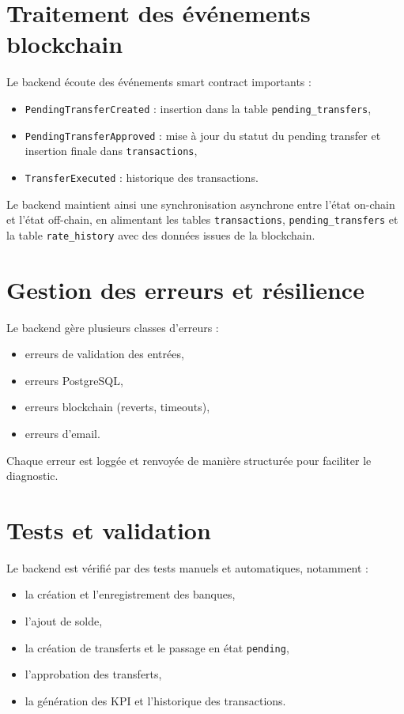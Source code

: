 \documentclass[a4paper,12pt]{report}
\begin{document}
\section{Traitement des événements blockchain}
Le backend écoute des événements smart contract importants :
\begin{itemize}[leftmargin=*,nosep]
  \item \texttt{PendingTransferCreated} : insertion dans la table \texttt{pending\_transfers},
  \item \texttt{PendingTransferApproved} : mise à jour du statut du pending transfer et insertion finale dans \texttt{transactions},
  \item \texttt{TransferExecuted} : historique des transactions.
\end{itemize}
Le backend maintient ainsi une synchronisation asynchrone entre l'état on-chain et l'état off-chain, en alimentant les tables \texttt{transactions}, \texttt{pending\_transfers} et la table \texttt{rate\_history} avec des données issues de la blockchain.

\section{Gestion des erreurs et résilience}
Le backend gère plusieurs classes d'erreurs :
\begin{itemize}[leftmargin=*,nosep]
  \item erreurs de validation des entrées,
  \item erreurs PostgreSQL,
  \item erreurs blockchain (reverts, timeouts),
  \item erreurs d'email.
\end{itemize}
Chaque erreur est loggée et renvoyée de manière structurée pour faciliter le diagnostic.

\section{Tests et validation}
Le backend est vérifié par des tests manuels et automatiques, notamment :
\begin{itemize}[leftmargin=*,nosep]
  \item la création et l'enregistrement des banques,
  \item l'ajout de solde,
  \item la création de transferts et le passage en état \texttt{pending},
  \item l'approbation des transferts,
  \item la génération des KPI et l'historique des transactions.
\end{itemize}
\end{document}
